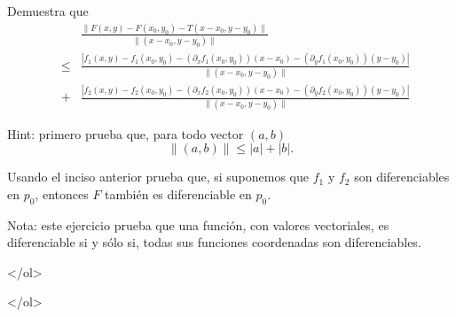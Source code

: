 \documentclass{article}
\theoremstyle{definition}
\begin{document}
          \item Demuestra que
            \begin{eqnarray*}
              & & \frac{\|F(x,y)-F(x_0,y_0)-T(x-x_0,y-y_0) \|}{\|(x-x_0,y-y_0)\|} \\
              &\leq &
                      \frac{|f_1(x,y)-f_1(x_0,y_0)-
                      (\partial_xf_1(x_0,y_0))(x-x_0)-
                      (\partial_yf_1(x_0,y_0))(y-y_0)|}
                      {\| (x-x_0,y-y_0)\|} \\
              &+&  \frac{|f_2(x,y)-f_2(x_0,y_0)-
                      (\partial_xf_2(x_0,y_0))(x-x_0)-
                      (\partial_yf_2(x_0,y_0))(y-y_0)|}
                      {\| (x-x_0,y-y_0)\|}
            \end{eqnarray*}

            Hint: primero prueba que, para todo vector $(a,b)$
            $$
            \| (a,b) \| \leq |a| + |b|.
            $$

            \item Usando el inciso anterior prueba que, si
          suponemos que $f_1$ y $f_2$ son diferenciables
          en $p_0$, entonces $F$ también es diferenciable
          en $p_0$.


          Nota: este ejercicio prueba que una función,
          con valores vectoriales, es diferenciable si y sólo si,
          todas sus funciones coordenadas son diferenciables.
         
          </ol>

        
</ol>


  
       
\end{document}
